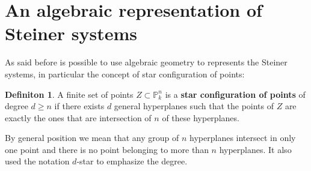 \documentclass[a4wide]{book}
\theoremstyle{plain}
\theoremstyle{remark}
\theoremstyle{definition}
\newtheorem{deff}[teo]{Definiton}
\newcommand{\PP}{\mathbb{P}}
\begin{document}
\section[Ideal of Steiner configuration]{An algebraic representation of Steiner systems}

As said before is possible to use algebraic geometry to represents the Steiner systems, in particular the concept of star configuration of points:

\begin{deff} \label{def:starconf}
A finite set of points $ Z \subset \PP_k^n $ is a \textbf{star configuration of points} of degree $ d \geq n $ if there exists $ d $ general hyperplanes such that the points of $ Z $ are exactly the ones that are intersection of $ n $ of these hyperplanes.
\end{deff}
By general position we mean that any group of $ n $ hyperplanes intersect in only one point and there is no point belonging to more than $ n $ hyperplanes. It also used the notation $ d $-star to emphasize the degree. 
\end{document}
